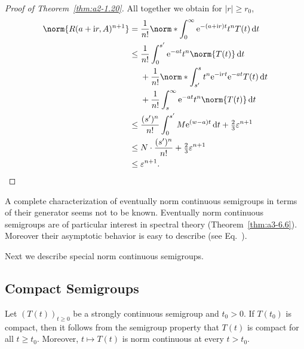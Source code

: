 \begin{proof}[Proof of Theorem~\ref{thm:a2-1.20}]
All together we obtain for $\lvert r\rvert \geq r_{0}$,
\begin{align*}
  \norm{R(a + \iu r,A)^{n+1}}
    &= \frac{1}{n!}
       \norm*{\int_0^\infty \eu^{-(a + \iu r)t} t^n T(t)\dt} \\
    &\leq \frac{1}{n!}\int_{0}^{s'} \eu^{-at} t^n \norm{T(t)}\dt \\
    &\phantom{{}\leq{}}
       + \frac{1}{n!}
         \norm*{\int_{s'}^{s} t^n \eu^{-\iu rt} \eu^{-at} T(t)\dt} \\
    &\phantom{{}\leq{}}
       + \frac{1}{n!}\int_{s}^{\infty} \eu^{-at} t^n \norm{T(t)}\dt \\
    &\leq \frac{(s')^{n}}{n!}\int_{0}^{s'} M \eu^{(w - a)t}\dt
          + \tfrac{2}{3}\epsilon^{n+1} \\
    &\leq N \cdot \frac{(s')^n}{n!} + \tfrac{2}{3}\epsilon^{n+1} \\
   &\leq \epsilon^{n+1}. \tag*{\qedsymbol}%
\end{align*}
\let\qedsymbol\relax
\end{proof}
A complete characterization of eventually norm continuous semigroups in terms of their generator seems not to be known.
Eventually norm continuous semigroups are of particular interest in spectral theory (\cf Theorem~\ref{thm:a3-6.6}).
Moreover their asymptotic behavior is easy to describe (see Eq.~).

Next we describe special norm continuous semigroups.
\subsection{Compact Semigroups} \label{subsec:a2-1.se7}%
Let $(T(t))_{t\geq 0}$ be a strongly continuous semigroup and $t_0 > 0$.
If\/ $T(t_0)$ is compact, then it follows from the semigroup property that $T(t)$ is compact for all $t \geq t_0$.
Moreover, $t \mapsto T(t)$ is norm continuous at every $t > t_0$.

